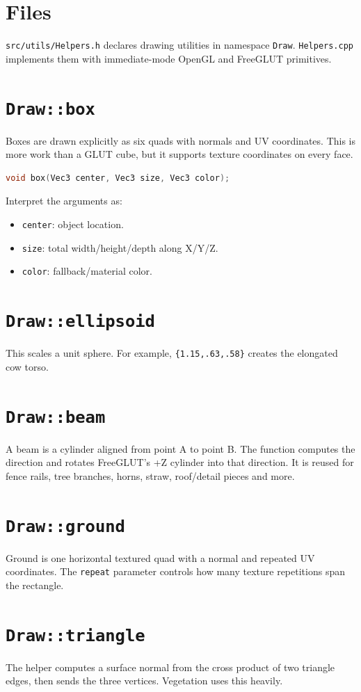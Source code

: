 \documentclass[11pt,a4paper,openany]{book}
\newcommand{\code}[1]{\texttt{#1}}
\newcommand{\file}[1]{\nolinkurl{#1}}
\begin{document}
\section{Files}
\file{src/utils/Helpers.h} declares drawing utilities in namespace \code{Draw}. \file{Helpers.cpp} implements them with immediate-mode OpenGL and FreeGLUT primitives.

\section{\texttt{Draw::box}}
Boxes are drawn explicitly as six quads with normals and UV coordinates. This is more work than a GLUT cube, but it supports texture coordinates on every face.

\begin{lstlisting}[language=C++]
void box(Vec3 center, Vec3 size, Vec3 color);
\end{lstlisting}
Interpret the arguments as:
\begin{itemize}
	\item \code{center}: object location.
	\item \code{size}: total width/height/depth along X/Y/Z.
	\item \code{color}: fallback/material color.
\end{itemize}

\section{\texttt{Draw::ellipsoid}}
This scales a unit sphere. For example, \code{\{1.15,.63,.58\}} creates the elongated cow torso.

\section{\texttt{Draw::beam}}
A beam is a cylinder aligned from point A to point B. The function computes the direction and rotates FreeGLUT's +Z cylinder into that direction. It is reused for fence rails, tree branches, horns, straw, roof/detail pieces and more.

\section{\texttt{Draw::ground}}
Ground is one horizontal textured quad with a normal and repeated UV coordinates. The \code{repeat} parameter controls how many texture repetitions span the rectangle.

\section{\texttt{Draw::triangle}}
The helper computes a surface normal from the cross product of two triangle edges, then sends the three vertices. Vegetation uses this heavily.
\end{document}
